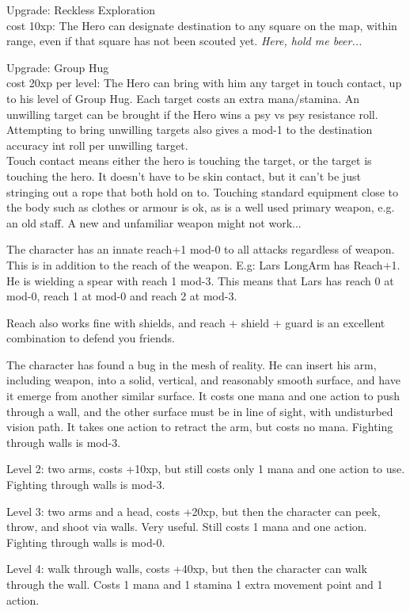 Upgrade: Reckless Exploration\\
cost 10xp: The Hero can designate destination to any square on the map, within range, even if that square has not been scouted yet. \emph{Here, hold me beer...}

Upgrade: Group Hug\\
cost 20xp per level: The Hero can bring with him any target in touch contact, up to his level of Group Hug. Each target costs an extra mana/stamina. An unwilling target can be brought if the Hero wins a psy vs psy resistance roll. Attempting to bring unwilling targets also gives a mod-1 to the destination accuracy int roll per unwilling target.\\
Touch contact means either the hero is touching the target, or the target is touching the hero. It doesn't have to be skin contact, but it can't be just stringing out a rope that both hold on to. Touching standard equipment close to the body such as clothes or armour is ok, as is a well used primary weapon, e.g. an old staff. A new and unfamiliar weapon might not work...


 The character has an innate reach+1 mod-0 to all attacks regardless of weapon. This is in addition to the reach of the weapon.
E.g: Lars LongArm has Reach+1. He is wielding a spear with reach 1 mod-3. This means that Lars has reach 0 at mod-0, reach 1 at mod-0 and reach 2 at mod-3.

Reach also works fine with shields, and reach + shield + guard is an excellent combination to defend you friends.


 The character has found a bug in the mesh of reality. He can insert his arm, including weapon, into a solid, vertical, and reasonably smooth surface, and have it emerge from another similar surface. It costs one mana and one action to push through a wall, and the other surface must be in line of sight, with undisturbed vision path. It takes one action to retract the arm, but costs no mana. Fighting through walls is mod-3.

Level 2: two arms, costs +10xp, but still costs only 1 mana and one action to use. Fighting through walls is mod-3.

Level 3: two arms and a head, costs +20xp, but then the character can peek, throw, and shoot via walls. Very useful. Still costs 1 mana and one action. Fighting through walls is mod-0.

Level 4: walk through walls, costs +40xp, but then the character can walk through the wall. Costs 1 mana and 1 stamina 1 extra movement point and 1 action.

